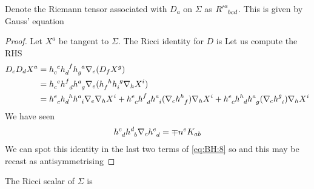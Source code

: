 \documentclass{article}
\begin{document}
\begin{prop}
Denote the Riemann tensor associated with $D_a$ on $\Sigma$ as ${R^\prime}\indices{^a_b_c_d}$. This is given by Gauss' equation 
\end{prop}
\begin{proof}
Let $X^a$ be tangent to $\Sigma$. The Ricci identity for $D$ is 
Let us compute the RHS 
\begin{align}\label{eq:BH:9}
D_c D_d X^a &= h\indices{_c^e}h\indices{_d^f}h\indices{_g^a}\nabla_e(D_f X^g) \\
&= h\indices{_c^e}h\indices{^f_d}h\indices{^a_g}\nabla_e ( h\indices{_f^h} h\indices{_i^g} \nabla_h X^i ) \\
&= h\indices{^e_c}h\indices{_d^h} h\indices{^a_i} \nabla_e \nabla_h X^i + h\indices{^e_c}h\indices{^f_d}h\indices{^a_i}(\nabla_c h\indices{^h_f}) \nabla_h X^i + h\indices{^e_c}h\indices{^h_d}h\indices{^a_g} (\nabla_c h\indices{^g_i}) \nabla_h X^i
\end{align}
We have seen 
\begin{align}\label{eq:BH:8}
h\indices{^c_d}h\indices{^d_b}\nabla_c h\indices{^e_d} = \mp n^e K_{ab}
\end{align}
We can spot this identity in the last two terms of \ref{eq:BH:8} so 
and this may be recast as 
antisymmetrising 
\end{proof}

\begin{lemma}
The Ricci scalar of $\Sigma$ is 
\end{lemma}
\end{document}
